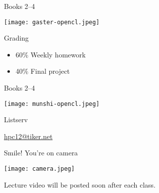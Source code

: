 \documentclass[english,compress]{beamer}
\begin{document}
\begin{frame}{Books 2--4}
  \begin{center}
    \texttt{[image: gaster-opencl.jpeg]}
  \end{center}
\end{frame}
\begin{frame}{Grading}
  \Large
  \begin{itemize}
    \item 60\% Weekly homework
    \item 40\% Final project
  \end{itemize}
\end{frame}
\begin{frame}{Books 2--4}
  \begin{center}
    \texttt{[image: munshi-opencl.jpeg]}
  \end{center}
\end{frame}
\begin{frame}{Listserv}
  \begin{center}
    \Huge
    \href{mailto:hpc12@tiker.net}{hpc12@tiker.net}
  \end{center}
\end{frame}
\begin{frame}{Smile! You're on camera}
  \begin{center}
    \texttt{[image: camera.jpeg]}

    Lecture video will be posted soon after each class.
  \end{center}
\end{frame}
\end{document}
